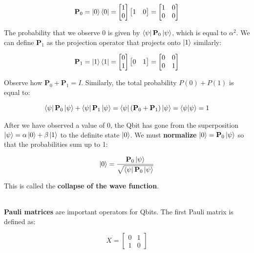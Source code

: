 \documentclass[12pt]{article}
\begin{document}
\[ \textbf{P}_0 = \ket{0}\bra{0} = \begin{bmatrix} 1 \\ 0 \end{bmatrix} \begin{bmatrix} 1 & 0 \end{bmatrix} = \begin{bmatrix}
    1 & 0 \\
    0 & 0
\end{bmatrix} \]

\newpage
\noindent
The probability that we observe 0 is given by $\bra{\psi}\textbf{P}_0\ket{\psi}$, which is equal to $\alpha^2$.
We can define $\textbf{P}_1$ as the projection operator that projects onto $\ket{1}$ similarly:

\[ \textbf{P}_1 = \ket{1}\bra{1} = \begin{bmatrix} 0 \\ 1 \end{bmatrix} \begin{bmatrix} 0 & 1 \end{bmatrix} = \begin{bmatrix}
    0 & 0 \\
    0 & 1
\end{bmatrix} \]

\noindent
Observe how $\textbf{P}_0 + \textbf{P}_1 = I$.
Similarly, the total probability $P(0) + P(1)$ is equal to: 

\[ \bra{\psi}\textbf{P}_0\ket{\psi} + \bra{\psi}\textbf{P}_1\ket{\psi} = \bra{\psi}(\textbf{P}_0 + \textbf{P}_1)\ket{\psi} = \braket{\psi | \psi} = 1 \]

\noindent
After we have observed a value of 0, the Qbit has gone from the superposition $\ket{\psi} = \alpha \ket{0} + \beta \ket{1}$ to the definite state $\ket{0}$.
We must \textbf{normalize} $\ket{0} = \textbf{P}_0\ket{\psi}$ so that the probabilities sum up to 1:

\[ \ket{0} = \frac{\textbf{P}_0\ket{\psi}}{\sqrt{\bra{\psi}\textbf{P}_0\ket{\psi}}} \]

\noindent
This is called the \textbf{collapse of the wave function}.

\noindent
\\
\textbf{Pauli matrices} are important operators for Qbits.
The first Pauli matrix is defined as:

\[ X = \begin{bmatrix}
    0 & 1 \\
    1 & 0
\end{bmatrix} \]
\end{document}

